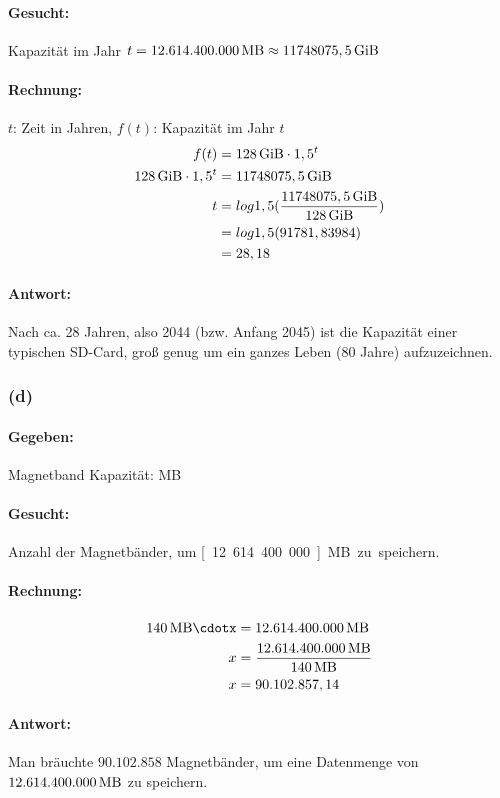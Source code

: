 \documentclass[11pt,a4paper]{article}
\begin{document}
\paragraph{Gesucht:}
    Kapazität im Jahr $t = \unit[12.614.400.000]{MB} \approx \unit[11748075,5]{GiB}$

\paragraph{Rechnung:}
    $t$: Zeit in Jahren, $f(t)$: Kapazität im Jahr $t$
\begin{align}
    f(t) &= \unit[128]{GiB}\cdot1,5^{t}\\
    \unit[128]{GiB}\cdot1,5^{t} &= \unit[11748075,5]{GiB}\\
    t &= log1,5(\frac{\unit[11748075,5]{GiB}}{\unit[128]{GiB}})\\
      &= log1,5(91781,83984)\\
       &= 28,18\\
\end{align}

\paragraph{Antwort:}
    Nach ca. 28 Jahren, also 2044 (bzw. Anfang 2045) ist die Kapazität einer typischen SD-Card, groß genug um ein ganzes Leben (80 Jahre) aufzuzeichnen.


\subsubsection{(d)} %

\paragraph{Gegeben:}
    Magnetband Kapazität: \unit[140]{MB}

\paragraph{Gesucht:}
    Anzahl der Magnetbänder, um \unit[12.614.400.000]{MB} zu speichern.

\paragraph{Rechnung:}
\begin{align}
    \unit[140]{MB}\cdotx &= \unit[12.614.400.000]{MB}\\
    x &= \frac{\unit[12.614.400.000]{MB}}{\unit[140]{MB}}\\
    x &= 90.102.857,14
\end{align}

\paragraph{Antwort:}
    Man bräuchte $90.102.858$ Magnetbänder, um eine Datenmenge von $\unit[12.614.400.000]{MB}$ zu speichern.


\newpage



\end{document}
